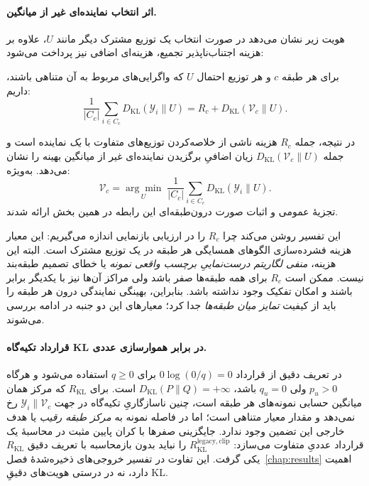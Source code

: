 \paragraph{اثر انتخاب نماینده‌ای غیر از میانگین.}
هویت زیر نشان می‌دهد در صورت انتخاب یک توزیع مشترک دیگر مانند $U$، علاوه بر هزینه اجتناب‌ناپذیر تجمیع، هزینه‌ای اضافی نیز پرداخت می‌شود:
\begin{theorem}\label{cmp:thm:ch3-KL-decomposition}
برای هر طبقه $c$ و هر توزیع احتمال $U$ که واگرایی‌های مربوط به آن متناهی باشند، داریم:
\begin{equation}\label{cmp:eq:ch3-KL-decomposition}
\boxed{
\frac{1}{|C_c|}\sum_{i\in C_c}
D_{\mathrm{KL}}(\mathscr Y_i\|U)
=R_c+D_{\mathrm{KL}}(\mathcal V_c\|U).}
\end{equation}
\end{theorem}
در نتیجه، جمله $R_c$ هزینه ناشی از خلاصه‌کردن توزیع‌های متفاوت با \emph{یک} نماینده است و جمله $D_{\mathrm{KL}}(\mathcal V_c\|U)$ زیان اضافیِ برگزیدن نماینده‌ای غیر از میانگین بهینه را نشان می‌دهد. به‌ویژه:
\begin{equation}\label{cmp:eq:ch3-KL-opt-center}
\boxed{\mathcal V_c=
\underset{U}{\arg\min}\;
\frac{1}{|C_c|}\sum_{i\in C_c}
D_{\mathrm{KL}}(\mathscr Y_i\|U).}
\end{equation}
تجزیهٔ عمومی و اثبات صورت درون‌طبقه‌ای این رابطه در همین بخش ارائه شدند.

این تفسیر روشن می‌کند چرا $R_c$ را در ارزیابی بازنمایی اندازه می‌گیریم: این معیار هزینه فشرده‌سازی الگوهای همسایگی هر طبقه در یک توزیع مشترک است. البته این هزینه، \emph{منفی لگاریتم درست‌نماییِ برچسب واقعی نمونه} یا خطای تصمیم طبقه‌بند نیست. ممکن است $R_c$ برای همه طبقه‌ها صفر باشد ولی مراکز آن‌ها نیز با یکدیگر برابر باشند و امکان تفکیک وجود نداشته باشد. بنابراین، بهینگی نمایندگی درون هر طبقه را باید از کیفیت \emph{تمایز میان طبقه‌ها} جدا کرد؛ معیارهای این دو جنبه در ادامه بررسی می‌شوند.

\paragraph{قرارداد تکیه‌گاه KL در برابر هموارسازی عددی.}
\label{cmp:par:ch3-KL-legacy-clip}
در تعریف دقیق از قرارداد $0\log(0/q)=0$ برای $q\ge0$
استفاده می‌شود و هرگاه $p_u>0$ ولی $q_u=0$ باشد،
$D_{\mathrm{KL}}(P\|Q)=+\infty$ است.
برای $R_{\mathrm{KL}}$ که مرکز همان میانگین حسابی
نمونه‌های هر طبقه است، چنین ناسازگاریِ تکیه‌گاه
در جهت $\mathscr Y_i\|\mathcal V_c$ رخ نمی‌دهد
و مقدار معیار متناهی است؛ اما در فاصله نمونه به
\emph{مرکز طبقه رقیب} یا هدف خارجی این تضمین وجود ندارد.
جایگزینی صفرها با کران پایین مثبت در محاسبهٔ
 یک قرارداد عددیِ متفاوت می‌سازد:
$R_{\mathrm{KL}}^{\mathrm{legacy,clip}}$
را نباید بدون باز‌محاسبه با تعریف دقیق
$R_{\mathrm{KL}}$ یکی گرفت. این تفاوت در
تفسیر خروجی‌های ذخیره‌شدهٔ فصل~\ref{chap:results}
اهمیت دارد، نه در درستی هویت‌های دقیقِ KL.

